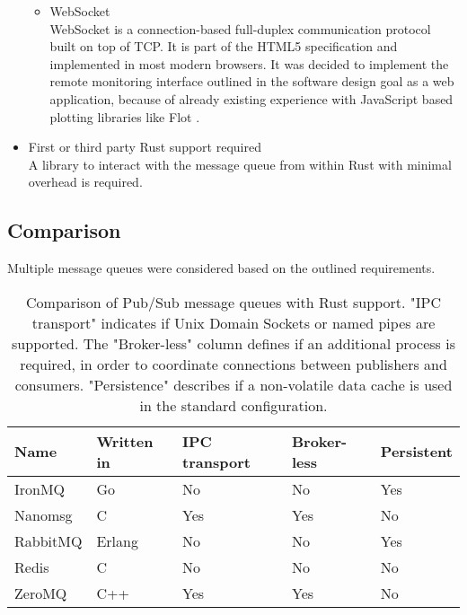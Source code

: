 \begin{itemize}
\begin{itemize}
  	\item WebSocket \\
  	WebSocket is a connection-based full-duplex communication protocol built on top of TCP. It is part of the HTML5 specification \cite{html5-spec} and implemented in most modern browsers. It was decided to implement the remote monitoring interface outlined in the software design goal as a web application, because of already existing experience with JavaScript based plotting libraries like Flot \cite{flot}.
  \end{itemize}
  \item First or third party Rust support required \\
  A library to interact with the message queue from within Rust with minimal overhead is required.
\end{itemize}


\subsection{Comparison}
Multiple message queues were considered based on the outlined requirements. 

\begin{table}[H]
\centering
\begin{tabular}{lllll}
Name     & Written in & IPC transport & Broker-less & Persistent \\ \hline
IronMQ   & Go                      & No            & No         & Yes        \\
Nanomsg  & C                       & Yes           & Yes        & No         \\
RabbitMQ & Erlang                  & No            & No         & Yes        \\
Redis    & C                       & No            & No         & No         \\
ZeroMQ   & C++                     & Yes           & Yes        & No

\end{tabular}
\caption{Comparison of Pub/Sub message queues with Rust support. "IPC transport" indicates if Unix Domain Sockets or named pipes are supported. The "Broker-less" column defines if an additional process is required, in order to coordinate connections between publishers and consumers. "Persistence" describes if a non-volatile data cache is used in the standard configuration.}
\end{table}

